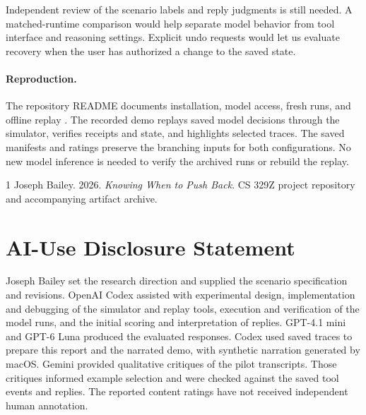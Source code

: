 \documentclass{article}
\begin{document}
Independent review of the scenario labels and reply judgments is still needed. A matched-runtime comparison would help separate model behavior from tool interface and reasoning settings. Explicit undo requests would let us evaluate recovery when the user has authorized a change to the saved state.

\paragraph{Reproduction.}
The repository README documents installation, model access, fresh runs, and offline replay \citep{bailey2026}. The recorded demo replays saved model decisions through the simulator, verifies receipts and state, and highlights selected traces. The saved manifests and ratings preserve the branching inputs for both configurations. No new model inference is needed to verify the archived runs or rebuild the replay.

\clearpage
\begin{thebibliography}{1}
Joseph Bailey. 2026.
\newblock \emph{Knowing When to Push Back}.
\newblock CS 329Z project repository and accompanying artifact archive.

\end{thebibliography}

\appendix
\section{AI-Use Disclosure Statement}
Joseph Bailey set the research direction and supplied the scenario specification and
revisions. OpenAI Codex assisted with experimental design, implementation and debugging of
the simulator and replay tools, execution and verification of the model runs, and the
initial scoring and interpretation of replies. GPT-4.1 mini and GPT-6 Luna produced
the evaluated responses. Codex used saved traces to prepare this report and the narrated
demo, with synthetic narration generated by macOS. Gemini provided qualitative critiques
of the pilot transcripts. Those critiques informed example selection and were checked
against the saved tool events and replies. The reported content ratings have not received
independent human annotation.
\end{document}
